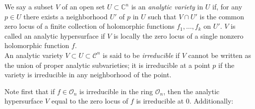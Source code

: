 \begin{defn}

	We say a subset $V$ of an open set $U \subset \mathbb{C}^n$ is an \textit{analytic variety} in $U$ if, for any $p \in U$ there exists a neighborhood $U'$ of $p$ in $U$ such that $V \cap U'$ is the common zero locus of a finite collection of holomorphic functions $f_1, \ldots, f_k$ on $U'$. $V$ is called an analytic hypersurface if $V$ is locally the zero locus of a single nonzero holomorphic function $f$.\\
\indent An analytic variety $V \subset U \subset \mathcal{ C }^n$ is said to be \textit{irreducible} if $V$ cannot be written as the union of proper analytic subvarieties; it is irreducible at a point $p$ if the variety is irreducible in any neighborhood of the point. 

\end{defn}

Note first that if $f \in \mathcal{O}_n$ is irreducible in the ring $ \mathcal{O}_n$, then the analytic hypersurface $V$ equal to the zero locus of $f$ is irreducible at 0. Additionally:

